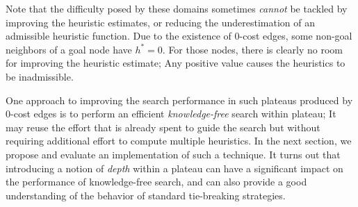 
Note that the difficulty posed by these domains sometimes \emph{cannot}
be tackled by improving the heuristic estimates, or reducing the
underestimation of an admissible heuristic function.  Due to the
existence of 0-cost edges, some non-goal neighbors of a goal node 
have $h^*=0$. For those nodes,
there is clearly no room for improving the heuristic estimate; Any positive
value causes the heuristics to be inadmissible.

One approach to improving the search performance in such plateaus
produced by 0-cost edges is to perform an efficient
\emph{knowledge-free} search within plateau; It may reuse the effort
that is already spent to guide the search but without requiring 
additional effort to compute multiple heuristics.
In the next section, we propose and evaluate an implementation of
such a technique. It turns out that introducing a notion of \emph{depth} within a plateau can have
a significant impact on the performance of knowledge-free search, and can also 
provide a good  understanding of the behavior of standard tie-breaking strategies.

